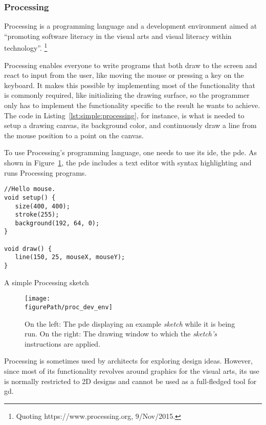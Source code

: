 \subsubsection{Processing}
\label{section:processing:related}
Processing\cite{reas2007processing} is a programming language and a development environment aimed at ``promoting software literacy in the visual arts and visual literacy within technology''.%
\footnote{Quoting https://www.processing.org, 9/Nov/2015.}

Processing enables everyone to write programs that both draw to the screen and react to input from the user, like moving the mouse or pressing a key on the keyboard.
It makes this possible by implementing most of the functionality that is commonly required, like initializing the drawing surface, so the programmer only has to implement the functionality specific to the result he wants to achieve.
The code in Listing~\ref{lst:simple:processing}, for instance, is what is needed to setup a drawing canvas, its background color, and continuously draw a line from the mouse position to a point on the canvas.

To use Processing's programming language, one needs to use its \gls{ide}, the \acrfull{pde}.
As shown in Figure~\ref{fig:proc:dev:env}, the \gls{pde} includes a text editor with syntax highlighting and runs Processing programs.

\begin{listing}
\begin{verbatim}
//Hello mouse.
void setup() {
   size(400, 400);
   stroke(255);
   background(192, 64, 0);
}

void draw() {
   line(150, 25, mouseX, mouseY);
}
\end{verbatim}
	\caption[A simple Processing sketch]{A simple Processing sketch}
	\label{lst:simple:processing}
\end{listing}

\begin{figure}
	\centering
	\texttt{[image: \\figurePath/proc\_dev\_env]}
	\caption{On the left: The \gls{pde} displaying an example \emph{sketch} while it is being run. On the right: The drawing window to which the \emph{sketch's} instructions are applied.}
	\label{fig:proc:dev:env}
\end{figure}

Processing is sometimes used by architects for exploring design ideas.
However, since most of its functionality revolves around graphics for the visual arts, its use is normally restricted to 2D designs and cannot be used as a full-fledged tool for \gls{gd}.

